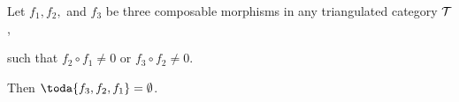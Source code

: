 \begin{proposition}
	\label{prop:toda_pairwise_non_vanishing_is_empty}
	Let \( f_1, f_2, \) and \( f_3 \) be three composable morphisms in any triangulated category \( {\mathcal{T}} \),
	\begin{center}
	\end{center}
	such that \( f_2 \circ f_1 \neq 0 \) or \( f_3 \circ f_2 \neq 0 \).

	Then \( \toda{f_3, f_2, f_1} = \emptyset \).
\end{proposition}
